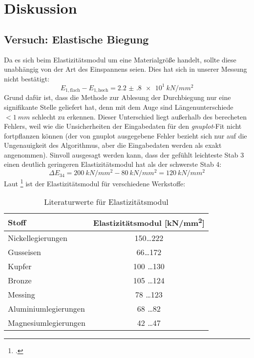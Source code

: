 \section{Diskussion}
\subsection{Versuch: Elastische Biegung}
Da es sich beim Elastizitätsmodul um eine Materialgröße handelt, sollte diese unabhängig von der Art des Einspannens seien. Dies hat sich in unserer Messung nicht bestätigt:
\begin{equation}
  E_{1,\text{flach}}-E_{1,\text{hoch}} = \SI{2.2(8)e1}{kN/mm^2}
  \label{eq:elastifalsch}
\end{equation}
Grund dafür ist, dass die Methode zur Ablesung der Durchbiegung nur eine signifikante Stelle geliefert hat, denn mit dem Auge sind Längenunterschiede $<\SI{1}{mm}$ schlecht zu erkennen. Dieser Unterschied liegt außerhalb des berecheten Fehlers, weil wie die Unsicherheiten der Eingabedaten für den \emph{gnuplot}-Fit nicht fortpflanzen können (der von gnuplot ausgegebene Fehler bezieht sich nur auf die Ungenauigkeit des Algorithmus, aber die Eingabedaten werden als exakt angenommen).
Sinvoll ausgesagt werden kann, dass der gefühlt leichteste Stab 3 einen deutlich geringeren Elastizitätsmodul hat als der schwerste Stab 4:
\begin{equation}
  \Delta E_{34}=\SI{200}{kN/mm^2} - \SI{80}{kN/mm^2}=\SI{120}{kN/mm^2}
  \label{eq:elastidiff34}
\end{equation}
Laut \footcite{ingenieurwissen} ist der Elastizitätsmodul für verschiedene Werkstoffe:

\begin{table}[H]
  \centering
  \begin{tabular}{l | c}
    Stoff & Elastizitätsmodul [\si{kN/mm^2}] \\ \hline
    Nickellegierungen & 150\ldots 222 \\
    Gusseisen & 66\ldots 172 \\
    Kupfer & 100 \ldots 130 \\
    Bronze & 105 \ldots 124 \\
    Messing & 78 \ldots 123 \\
    Aluminiumlegierungen & 68 \ldots 82 \\
    Magnesiumlegierungen & 42 \ldots 47
  \end{tabular}
  \caption{Literaturwerte für Elastizitätsmodul}
  \label{tab:litwertelasti}
\end{table}

